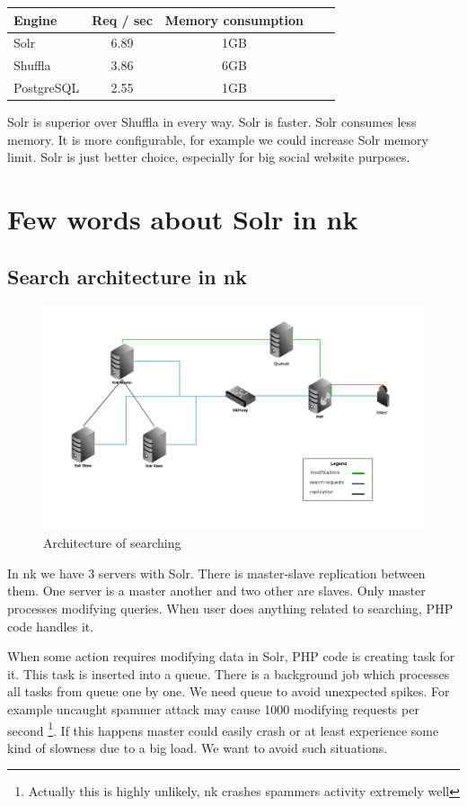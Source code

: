 \documentclass[10pt,a4paper]{article}
\begin{document}
\begin{tabular}{|l|c|c|c|c|}
\hline Engine & Req / sec & Memory consumption \\
\hline Solr & 6.89 & 1GB \\
\hline Shuffla & 3.86 & 6GB  \\
\hline PostgreSQL & 2.55 & 1GB \\
\hline 
\end{tabular}

Solr is superior over Shuffla in every way. Solr is faster. Solr consumes less memory. It is more configurable, for example we could increase Solr memory limit. Solr is just better choice, especially for big social website purposes. 

\section{Few words about Solr in nk}

\subsection{Search architecture in nk}

\begin{figure}
\centering
  \includegraphics[width=12cm]{architektura_wyszukiwania}
  \caption{Architecture of searching}
  \label{fig:architektura_wyszukiwania}
\end{figure}

In nk we have 3 servers with Solr. There is master-slave replication between them. One server is a master another and two other are slaves. Only master processes modifying queries. When user does anything related to searching, PHP code handles it.

When some action requires modifying data in Solr, PHP code is creating task for it. This task is inserted into a queue. There is a background job which processes all tasks from queue one by one. We need queue to avoid unexpected spikes. For example uncaught spammer attack may cause 1000 modifying requests per second \footnote{Actually this is highly unlikely, nk crashes spammers activity extremely well}. If this happens master could easily crash or at least experience some kind of slowness due to a big load. We want to avoid such situations. 
\end{document}
